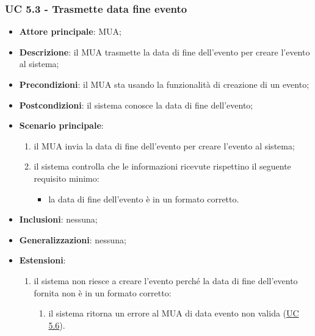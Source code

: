    \subsubsection{UC 5.3 - Trasmette data fine evento} \label{sec:UC5.3}
    \begin{itemize}
        \item \textbf{Attore principale}: MUA;
        \item \textbf{Descrizione}: il MUA trasmette la data di fine dell'evento per creare l'evento al sistema;
        \item \textbf{Precondizioni}: il MUA sta usando la funzionalità di creazione di un evento;
        \item \textbf{Postcondizioni}: il sistema conosce la data di fine dell'evento;
        \item \textbf{Scenario principale}:
            \begin{enumerate}
                \item il MUA invia la data di fine dell'evento per creare l'evento al sistema;
                \item il sistema controlla che le informazioni ricevute rispettino il seguente requisito minimo:
                    \begin{itemize}
                        \item la data di fine dell'evento è in un formato corretto.
                    \end{itemize}
            \end{enumerate}
        \item \textbf{Inclusioni}: nessuna;
        \item \textbf{Generalizzazioni}: nessuna;
        \item \textbf{Estensioni}:
            \begin{enumerate}[label=\alph*.]
                \item il sistema non riesce a creare l'evento perché la data di fine dell'evento fornita non è in un formato corretto:
                \begin{enumerate}[label=\arabic*.]
                    \item il sistema ritorna un errore al MUA di data evento non valida (\hyperref[sec:UC5.6]{UC 5.6}).
                \end{enumerate}
            \end{enumerate}
    \end{itemize}

